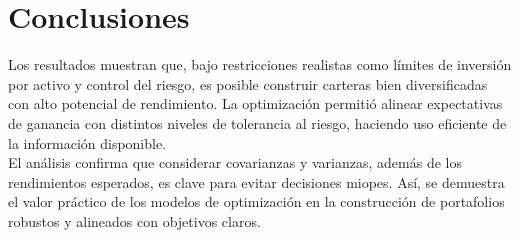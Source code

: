 \chapter{Conclusiones}
Los resultados muestran que, bajo restricciones realistas como límites de inversión por activo y control del riesgo, es posible construir carteras 
bien diversificadas con alto potencial de rendimiento. La optimización permitió alinear expectativas de ganancia con distintos niveles de tolerancia 
al riesgo, haciendo uso eficiente de la información disponible.\\

El análisis confirma que considerar covarianzas y varianzas, además de los rendimientos esperados, es clave para evitar decisiones miopes. 
Así, se demuestra el valor práctico de los modelos de optimización en la construcción de portafolios robustos y alineados con objetivos claros.
